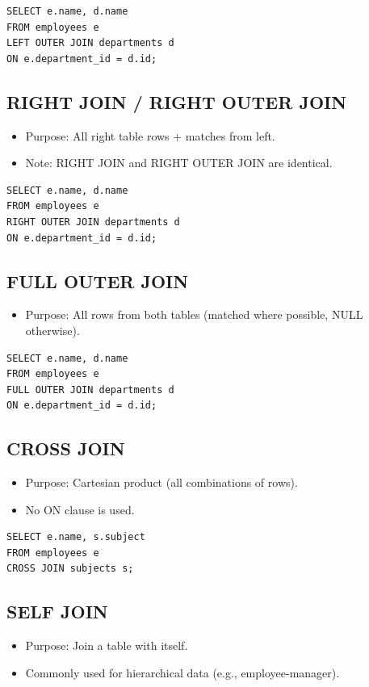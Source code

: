 \documentclass[10pt]{article}
\begin{document}
\begin{verbatim}
SELECT e.name, d.name
FROM employees e
LEFT OUTER JOIN departments d
ON e.department_id = d.id;
\end{verbatim}

\subsection{RIGHT JOIN / RIGHT OUTER JOIN}
\begin{itemize}
    \item Purpose: All right table rows + matches from left.
    \item Note: RIGHT JOIN and RIGHT OUTER JOIN are identical.
\end{itemize}

\begin{verbatim}
SELECT e.name, d.name
FROM employees e
RIGHT OUTER JOIN departments d
ON e.department_id = d.id;
\end{verbatim}

\subsection{FULL OUTER JOIN}
\begin{itemize}
    \item Purpose: All rows from both tables (matched where possible, NULL otherwise).
\end{itemize}

\begin{verbatim}
SELECT e.name, d.name
FROM employees e
FULL OUTER JOIN departments d
ON e.department_id = d.id;
\end{verbatim}

\subsection{CROSS JOIN}
\begin{itemize}
    \item Purpose: Cartesian product (all combinations of rows).
    \item No ON clause is used.
\end{itemize}

\begin{verbatim}
SELECT e.name, s.subject
FROM employees e
CROSS JOIN subjects s;
\end{verbatim}

\subsection{SELF JOIN}
\begin{itemize}
    \item Purpose: Join a table with itself.
    \item Commonly used for hierarchical data (e.g., employee-manager).
\end{itemize}
\end{document}
